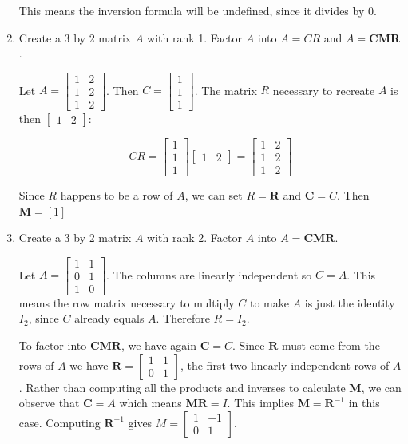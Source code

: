 \documentclass{scrartcl}
\begin{document}
\begin{enumerate}
This means the inversion formula will be undefined, since it divides by 0.

\item Create a 3 by 2 matrix $A$ with rank 1. Factor $A$ into $A = CR$ and $A = \mathbf{CMR}$.


Let $A = \begin{bmatrix}
	1 & 2 \\ 1 & 2 \\ 1 & 2
\end{bmatrix}$. Then $C = \begin{bmatrix}
	1 \\ 1 \\ 1
\end{bmatrix}$. The matrix $R$ necessary to recreate $A$ is then $\begin{bmatrix}
	1 & 2
\end{bmatrix}$:

$$CR = \begin{bmatrix}
	1 \\ 1 \\ 1
\end{bmatrix}\begin{bmatrix}
	1 & 2
\end{bmatrix} = \begin{bmatrix}
	1 & 2 \\ 1 & 2 \\ 1 & 2
\end{bmatrix}$$

Since $R$ happens to be a row of $A$, we can set $R = \mathbf{R}$ and $\mathbf{C} = C$. Then $\mathbf{M} = [1]$

\item Create a 3 by 2 matrix $A$ with rank 2. Factor $A$ into $A = \mathbf{CMR}$.


Let $A = \begin{bmatrix}
	1 & 1 \\ 0 & 1 \\ 1 & 0
\end{bmatrix}$. The columns are linearly independent so $C = A$. This means the row matrix necessary to multiply $C$ to make $A$ is just the identity $I_2$, since $C$ already equals $A$. Therefore $R = I_2$.

To factor into $\mathbf{CMR}$, we have again $\mathbf{C} = C$. Since $\mathbf{R}$ must come from the rows of $A$ we have $\mathbf{R} = \begin{bmatrix}
	1 & 1 \\ 0 & 1
\end{bmatrix}$, the first two linearly independent rows of $A$. Rather than computing all the products and inverses to calculate $\mathbf{M}$, we can observe that $\mathbf{C} = A$ which means $\mathbf{MR} = I$. This implies $\mathbf{M} = \mathbf{R}^{-1}$ in this case. Computing $\mathbf{R}^{-1}$ gives $M = \begin{bmatrix}
	1 & - 1 \\ 0 & 1
\end{bmatrix} $.
\end{enumerate}
\end{document}
